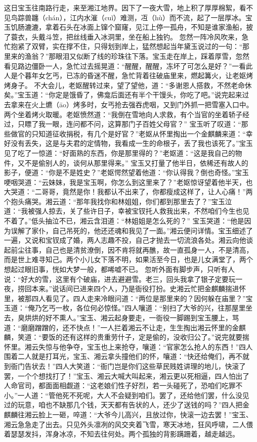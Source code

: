 \documentclass[12pt,oneside]{book}
\begin{document}
这日宝玉往南路行走，来至湘江地界。因下了一夜大雪，地上积了厚厚棉絮，看不见鸟踪兽躔（chán），江内水漼（cuǐ）难测，冱（hù）而不流，起了一层厚冰。宝玉饥肠漉漉，拿着石头在冰面上镩个窟窿，见江上停一孤舟，不知是谁家渔船，披了蓑衣，头戴斗笠，把丝线垂入冰洞里，坐在船上独钓。
忽然一阵冷风吹来，急忙抱紧了双臂，实在撑不住，只得划到岸上，猛然想起当年黛玉说过的一句：“那里来的渔翁？”那眼泪又似断了线的珍珠往下落。宝玉走在岸上，踩着厚雪，忽然看见路边僵卧一人，急忙过去摇晃道：“醒醒，醒醒，冻坏了可怎么是好？”一看此人是个暮年女乞丐，已冻的昏迷不醒，急忙背着往破庙里来，燃起篝火，让老妪烤烤身子。
不大会儿，老妪醒转过来，望了望他，道：“多谢恩人搭救，不然老命休矣。”宝玉道：“你定是饿昏了，佛龛后面还有半个干馒头，你吃了吧。”说完起来过去拿来在火上爊（āo）烤多时，女丐抢去强吞虎咽，又到门外抓一把雪塞入口中。两个坐着烤火取暖。老妪愤然道：“我倒在雪地向人求救，有个当官的坐着轿子经过，只瞟了我一眼，连问都不问，这算那门子百姓父母官？”
宝玉听了叹道：“那些做官的只知道征收捐税，有几个是好官？”老妪从怀里掏出一个金麒麟来道：“幸好没有丢失，这是与夫君的定情物，我看成一生的命根子，丢了我也该死了。”宝玉见了吃了一惊道：“好面熟的东西，你是那里得的？”老妪道：“这是我自己的物件，又不是偷别人的，谈何从那里得来。”
宝玉又打量了他半日，依稀还有故人的影子，便道：“你是不是姓史？”老妪愕然望着他道：“你认得我？倒也奇怪。”宝玉哽咽哭道：“云妹妹，我是宝玉啊，你怎么到这里来了？”老妪惊讶望着他半天，也大哭道：“二哥哥，竟然是你！我都认不出来了，你都瘦成这样了，让人心痛！”两个抱头痛哭。湘云道：“那年我找你和林姐姐，你们都到那里去了？”宝玉泣道：“我被强人掠去，关了些许日子，幸被宝钗托人救我出来，不然咱们今生也见不着了。”低头抽泣不已，湘云含泪道：“林姐姐是怎么死的？”
宝玉哭道：“他是因为误解了家仆，自己吊死的，他还还魂和我见了一面。”湘云便问详情。宝玉细述了一遍，又说和宝钗成了婚，两人志趣不投，自己才抛去一切流浪各处。湘云向他谈起前尘往事，自己也是清贫潦倒，因不肯将就再醮，故一直孤身一人，不是清高，而是世上难寻知己。两个小儿女下落不明，如果活至今日，也是儿女满堂了，两个想起过眼旧事，恍如大梦一般，都唏嘘不已。
忽听外面有脚步声，只听有人说：“好大的雪，这里有个破庙，进去避避雪。老三，回头我拿了银子定要玩一夜，捞回本来。”说话间已进来四个人，乃是衙役打扮。史湘云忙把金麒麟揣进怀里，被那四人看见了。四人走来冷眼问道：“两位是那里来的？因何躲在庙里？”宝玉道：“俺乃乞丐一枚，各位何必惊怪。”四人嚷道：“别扫了大爷的兴，往那屋里坐去，臭烘烘的好不熏人。”宝玉、湘云起身要走，一衙役一脚踢到宝玉腰上，骂道：“磨磨蹭蹭的，还不快点！”一人拦着湘云不让走，生生掏出湘云怀里的金麒麟，笑道：“要饭的还有这样的贵重劳什子，定是偷的，没收归公了。”说完就要揣怀里。湘云失惊与他争夺，宝玉也上来抢夺，嚷道：“官家怎么抢人的东西！”四人围着二人就是打耳光，宝玉、湘云拿头撞他们的怀，嚷道：“快还给俺们，再不就到衙门告状去！”四人大笑道：“衙门岂是你们这些草民贱姓讲理的地儿，快滚了罢，一个个想找打了！”宝玉、湘云大喊大叫起来，湘云更以死相逼，四人怕出了人命官司，都面面相觑道：“这老娘们性子好烈，若一头碰死了，恐咱们吃罪不小。”一人道：“管他死不死呢，大人不会疑到咱们。罢了，还给他们罢，什么没见过的玩意，咱也不缺那几个钱，天天都有告状的人，还少了送钱的吗？”四人把金麒麟往湘云脸上一砸，啐道：“大爷今儿高兴，且放过你，快滚一边去罢！”宝玉、湘云急急走了出去。只见外头凛冽的风交夹着飞雪，寒天冰地，狂风呼啸，二人偎着瑟瑟发抖，浑身冰凉，不知去往何处。两个孤独的背影蹒跚着，越走越远。
\end{document}

